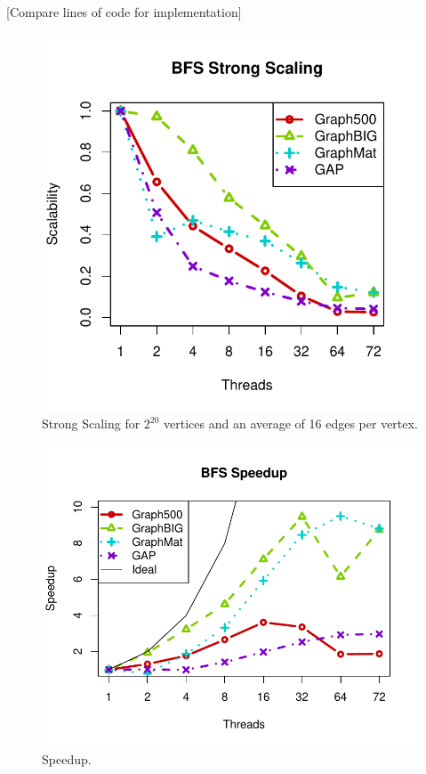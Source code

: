 \documentclass[conference]{IEEEtran}
\begin{document}
[Compare lines of code for implementation]

\begin{figure}
	\centering
	\includegraphics[width=0.8\columnwidth]{graphics/bfs_ss.pdf}
	\vspace{-18pt}
	\caption{Strong Scaling for $2^{20}$ vertices and an average of 16 edges per vertex.}
	\label{fig:bfs-ss}
\end{figure}

\begin{figure}
	\centering
	\includegraphics[width=\columnwidth, trim=0 18pt 18pt 0, clip]{graphics/bfs_speedup.pdf}
	\caption{Speedup.}
	\label{fig:bfs-speedup}
\end{figure}
\end{document}
